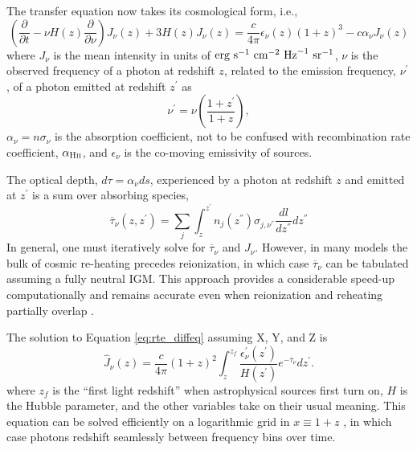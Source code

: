 The transfer equation now takes its cosmological form, i.e., 
\begin{equation}
    \left(\frac{\partial}{\partial t} - \nu H(z) \frac{\partial}{\partial \nu} \right) J_{\nu}(z) + 3 H(z) J_{\nu}(z) =  \frac{c}{4\pi} \epsilon_{\nu}(z) (1 + z)^3 - c \alpha_{\nu} J_{\nu}(z) \label{eq:rte_diffeq}
\end{equation}
where $J_{\nu}$ is the mean intensity in units of $\text{erg} \ \text{s}^{-1} \ \text{cm}^{-2} \ \mathrm{Hz}^{-1} \ \text{sr}^{-1}$, $\nu$ is the observed frequency of a photon at redshift $z$, related to the emission frequency, $\nu^{\prime}$, of a photon emitted at redshift $z^{\prime}$ as
\begin{equation}
    \nu^{\prime} = \nu \left(\frac{1 + z^{\prime}}{1 + z}\right) , \label{eq:EmissionFrequency}
\end{equation}
$\alpha_{\nu} = n \sigma_{\nu}$ is the absorption coefficient, not to be confused with recombination rate coefficient, $\alpha_{\text{H} {\textsc{ii}}}$, and $\epsilon_{\nu}$ is the co-moving emissivity of sources.

The optical depth, $d\tau = \alpha_{\nu} ds$, experienced by a photon at redshift $z$ and emitted at $z^{\prime}$ is a sum over absorbing species,
\begin{equation}
    \overline{\tau}_{\nu}(z, z^{\prime}) = \sum_j \int_{z}^{z^{\prime}} n_j(z^{\dprime}) \sigma_{j, \nu^{\dprime}} \frac{dl}{dz^{\dprime}}dz^{\dprime} \label{eq:tau_igm}
\end{equation}
In general, one must iteratively solve for $\overline{\tau}_{\nu}$ and $J_{\nu}$. However, in many models the bulk of cosmic re-heating precedes reionization, in which case $\overline{\tau}_{\nu}$ can be tabulated assuming a fully neutral IGM. This approach provides a considerable speed-up computationally and remains accurate even when reionization and reheating partially overlap \cite{Mirocha2014}.

The solution to Equation \ref{eq:rte_diffeq} {\color{red} assuming X, Y, and Z} is
\begin{equation}
    \hat{J}_{\nu} (z) = \frac{c}{4\pi} (1 + z)^2 \int_{z}^{z_f} \frac{\epsilon_{\nu}^{\prime}(z^{\prime})}{H(z^{\prime})} e^{-\overline{\tau}_{\nu}} dz^{\prime} . \label{eq:AngleAveragedFlux}
\end{equation}    
where $z_f$ is the ``first light redshift'' when astrophysical sources first turn on, $H$ is the Hubble parameter, and the other variables take on their usual meaning. This equation can be solved efficiently on a logarithmic grid in $x\equiv 1+z$ \cite{Haardt1996,Mirocha2014}, in which case photons redshift seamlessly between frequency bins over time.


